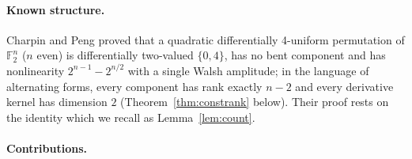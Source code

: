 \documentclass[11pt]{article}
\theoremstyle{definition}
\newcommand{\F}{\mathbb{F}}
\begin{document}
\paragraph{Known structure.} Charpin and Peng \cite[Theorems~1 and~7]{CP19} proved that a
quadratic differentially 4-uniform permutation of $\F_2^n$ ($n$ even) is differentially
two-valued $\{0,4\}$, has no bent component and has nonlinearity $2^{n-1}-2^{n/2}$ with a
single Walsh amplitude; in the language of alternating forms, every component has rank exactly
$n-2$ and every derivative kernel has dimension $2$ (Theorem~\ref{thm:constrank} below). Their
proof rests on the identity \cite[Theorem~5]{CP19} which we recall as
Lemma~\ref{lem:count}.

\paragraph{Contributions.}
\end{document}
